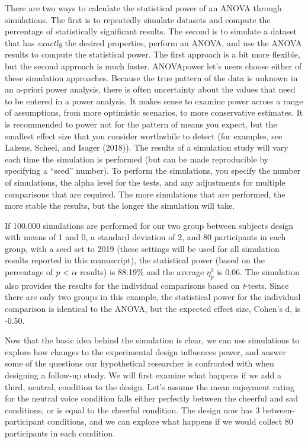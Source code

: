 \documentclass[,jou,floatsintext]{apa6}
\begin{document}
There are two ways to calculate the statistical power of an ANOVA through simulations.
The first is to repeatedly simulate datasets and compute the percentage of statistically significant results.
The second is to simulate a dataset that has \emph{exactly} the desired properties, perform an ANOVA, and use the ANOVA results to compute the statistical power.
The first approach is a bit more flexible, but the second approach is much faster.
ANOVApower let's users choose either of these simulation approaches.
Because the true pattern of the data is unknown in an a-priori power analysis, there is often uncertainty about the values that need to be entered in a power analysis.
It makes sense to examine power across a range of assumptions, from more optimistic scenarios, to more conservative estimates.
It is recommended to power not for the pattern of means you expect, but the smallest effect size that you consider worthwhile to detect (for examples, see Lakens, Scheel, and Isager (2018)).
The results of a simulation study will vary each time the simulation is performed (but can be made reproducible by specifying a \enquote{seed} number).
To perform the simulations, you specify the number of simulations, the alpha level for the tests, and any adjustments for multiple comparisons that are required.
The more simulations that are performed, the more stable the results, but the longer the simulation will take.

If 100.000 simulations are performed for our two group between subjects design with means of 1 and 0, a standard deviation of 2, and 80 participants in each group, with a seed set to 2019 (these settings will be used for all simulation results reported in this manuscript), the statistical power (based on the percentage of \emph{p} \textless{} \(\alpha\) results) is 88.19\% and the average \(\eta_p^2\) is 0.06.
The simulation also provides the results for the individual comparisons based on \emph{t}-tests.
Since there are only two groups in this example, the statistical power for the individual comparison is identical to the ANOVA, but the expected effect size, Cohen's d, is -0.50.

Now that the basic idea behind the simulation is clear, we can use simulations to explore how changes to the experimental design influences power, and answer some of the questions our hypothetical researcher is confronted with when designing a follow-up study.
We will first examine what happens if we add a third, neutral, condition to the design.
Let's assume the mean enjoyment rating for the neutral voice condition falls either perfectly between the cheerful and sad conditions, or is equal to the cheerful condition.
The design now has 3 between-participant conditions, and we can explore what happens if we would collect 80 participants in each condition.
\end{document}
